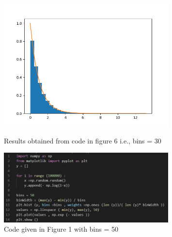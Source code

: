 \documentclass[answers]{exam}
\begin{document}
\begin{framed}
\begin{figure}[H] %
    \centering
    \includegraphics[width= 0.8\textwidth]{Q2.1_bins=30.png}
    \caption{Results obtained from code in figure 6 i.e., bins = 30}
    \vspace{2cm}
    \includegraphics[width= 0.8\textwidth]{Q2.1_bins=50_code.PNG}
    \caption{Code given in Figure 1 with bins = 50}
\end{figure}


\end{framed}
\end{document}
